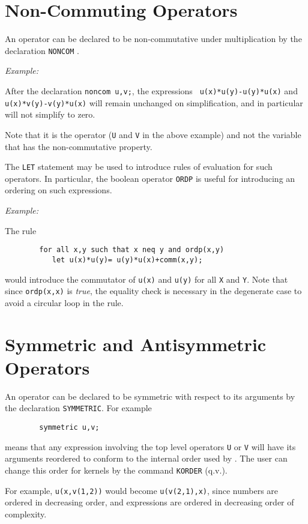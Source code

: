 \section{Non-Commuting Operators}
An operator can be declared to be non-commutative under multiplication by
the declaration {\tt NONCOM} .

{\it Example:}

After the declaration {\tt noncom u,v;}, the expressions {\tt
u(x)*u(y)-u(y)*u(x)} and {\tt u(x)*v(y)-v(y)*u(x)} will remain unchanged
on simplification, and in particular will not simplify to zero.

Note that it is the operator ({\tt U} and {\tt V} in the above example)
and not the variable that has the non-commutative property.

The {\tt LET}  statement may be used to introduce rules of
evaluation for such operators.  In particular, the boolean operator
{\tt ORDP} is useful for introducing an ordering on such
expressions.

{\it Example:}

The rule
\begin{verbatim}
        for all x,y such that x neq y and ordp(x,y)
           let u(x)*u(y)= u(y)*u(x)+comm(x,y);
\end{verbatim}
would introduce the commutator of {\tt u(x)} and {\tt u(y)} for all
{\tt X} and {\tt Y}.  Note that since {\tt ordp(x,x)} is {\em true}, the
equality check is necessary in the degenerate case to avoid a circular
loop in the rule.

\section{Symmetric and Antisymmetric Operators}

An operator can be declared to be symmetric with respect to its arguments
by the declaration {\tt SYMMETRIC}.  For example
\begin{verbatim}
        symmetric u,v;
\end{verbatim}
means that any expression involving the top level operators {\tt U} or
{\tt V} will have its arguments reordered to conform to the internal order
used by {\REDUCE}.  The user can change this order for kernels by the
command {\tt KORDER} (q.v.).

For example, {\tt u(x,v(1,2))} would become {\tt u(v(2,1),x)}, since
numbers are ordered in decreasing order, and expressions are ordered in
decreasing order of complexity.

